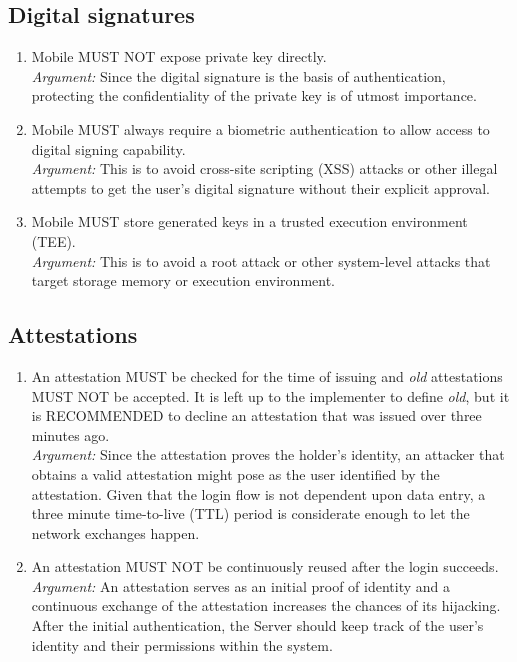     \subsection{Digital signatures}
        \begin{enumerate}[resume]
            \item Mobile MUST NOT expose private key directly.\\
            \textit{Argument:} Since the digital signature is the basis of authentication, protecting the 
                               confidentiality of the private key is of utmost importance.                               

            \item Mobile MUST always require a biometric authentication to allow access to digital signing 
                  capability.\\        
            \textit{Argument:} This is to avoid cross-site scripting (XSS) attacks or other illegal attempts to 
                               get the user's digital signature without their explicit approval.

            \item Mobile MUST store generated keys in a trusted execution environment (TEE).\\        
            \textit{Argument:} This is to avoid a root attack or other system-level attacks that target storage 
                               memory or execution environment.
        \end{enumerate}

    \subsection{Attestations}
        \begin{enumerate}[resume]
            \item An attestation MUST be checked for the time of issuing and \textit{old} attestations MUST NOT be
                  accepted. It is left up to the implementer to define \textit{old}, but it is RECOMMENDED to
                  decline an attestation that was issued over three minutes ago.\\
            \textit{Argument:} Since the attestation proves the holder's identity, an attacker that obtains a valid
                               attestation might pose as the user identified by the attestation. Given that the login
                               flow is not dependent upon data entry, a three minute time-to-live (TTL) period is 
                               considerate enough to let the network exchanges happen.

            \item An attestation MUST NOT be continuously reused after the login succeeds.\\
            \textit{Argument:} An attestation serves as an initial proof of identity and a continuous exchange of the
                               attestation increases the chances of its hijacking. After the initial authentication, the
                               Server should keep track of the user's identity and their permissions within the system. 
        \end{enumerate}
    
